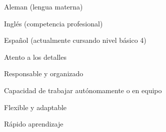 \newline

\begin{cvparagraph}
  \begin{cvitems}
    \item Aleman (lengua materna)
    \item Inglés (competencia profesional)
    \item Español (actualmente cursando nivel básico 4)
    \end{cvitems}
\end{cvparagraph}

\newline

\begin{cvparagraph}
\begin{cvitems}
  \item Atento a los detalles
  \item Responsable y organizado
  \item Capacidad de trabajar autónomamente o en equipo
  \item Flexible y adaptable
  \item Rápido aprendizaje
\end{cvitems}
\end{cvparagraph}



